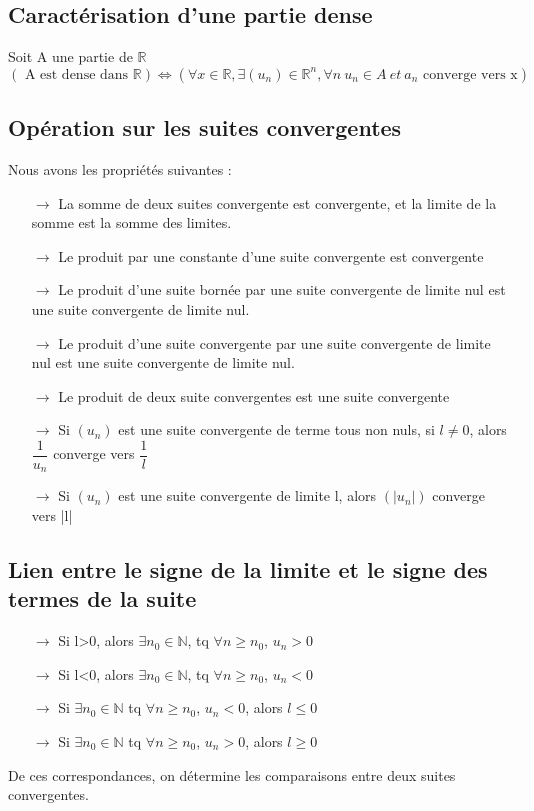 \subsection{Caractérisation d'une partie dense}
Soit A une partie de $\mathbb{R}$
$$(\mbox{ A est dense dans } \mathbb{R}) \Leftrightarrow (\forall x \in \mathbb{R}, \exists(u_n) \in \mathbb{R}^n, \forall n ~u_n \in A~ et~ a_n\mbox{ converge vers x})$$
\subsection{Opération sur les suites convergentes}
Nous avons les propriétés suivantes :\\
\begin{itemize}
 \item[$\rightarrow$] La somme de deux suites convergente est convergente, et la limite de la somme est la somme des limites.\\
 \item[$\rightarrow$] Le produit par une constante d'une suite convergente est convergente\\
 \item[$\rightarrow$] Le produit d'une suite bornée par une suite convergente de limite nul est une suite convergente de limite nul.\\
 \item[$\rightarrow$] Le produit d'une suite convergente par une suite convergente de limite nul est une suite convergente de limite nul.\\
 \item[$\rightarrow$] Le produit de deux suite convergentes est une suite convergente\\
 \item[$\rightarrow$] Si $(u_n)$ est une suite convergente de terme tous non nuls, si $l \neq 0$, alors $\dfrac{1}{u_n}$ converge vers $\dfrac{1}{l}$\\
 \item[$\rightarrow$] Si $(u_n)$ est une suite convergente de limite l, alors $(|u_n|)$ converge vers |l|\\
\end{itemize}
\subsection{Lien entre le signe de la limite et le signe des termes de la suite}
\begin{itemize}
 \item[$\rightarrow$] Si l>0, alors $\exists n_0 \in \mathbb{N}$, tq $\forall n \geq n_0$, $u_n > 0$\\
 \item[$\rightarrow$] Si l<0, alors $\exists n_0 \in \mathbb{N}$, tq $\forall n \geq n_0$, $u_n < 0$\\
 \item[$\rightarrow$] Si $\exists n_0 \in \mathbb{N} $ tq $\forall n \geq n_0$, $u_n < 0$, alors $l \leq 0$\\
 \item[$\rightarrow$]Si $\exists n_0 \in \mathbb{N} $ tq $\forall n \geq n_0$, $u_n > 0$, alors $l \geq 0$\\
\end{itemize}
De ces correspondances, on détermine les comparaisons entre deux suites convergentes.
